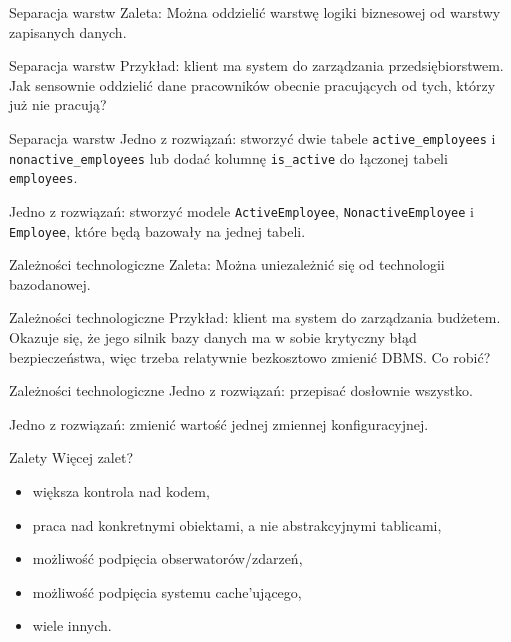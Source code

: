 \begin{frame}{Separacja warstw}
	Zaleta: Można oddzielić warstwę logiki biznesowej od warstwy zapisanych danych.
\end{frame}
	
\begin{frame}{Separacja warstw}	
	Przykład: klient ma system do zarządzania przedsiębiorstwem. Jak sensownie oddzielić dane pracowników obecnie pracujących od tych, którzy już nie pracują?
\end{frame}
	
\begin{frame}{Separacja warstw}
	Jedno z rozwiązań: stworzyć dwie tabele \texttt{active\_employees} i \texttt{nonactive\_employees} lub dodać kolumnę \texttt{is\_active} do łączonej tabeli \texttt{employees}.
	
	Jedno z rozwiązań: stworzyć modele \texttt{ActiveEmployee}, \texttt{NonactiveEmployee} i \texttt{Employee}, które będą bazowały na jednej tabeli.
\end{frame}

\begin{frame}{Zależności technologiczne}
	Zaleta: Można uniezależnić się od technologii bazodanowej.
\end{frame}
	
\begin{frame}{Zależności technologiczne}	
	Przykład: klient ma system do zarządzania budżetem. Okazuje się, że jego silnik bazy danych ma w sobie krytyczny błąd bezpieczeństwa, więc trzeba relatywnie bezkosztowo zmienić DBMS. Co robić?
\end{frame}
	
\begin{frame}{Zależności technologiczne}	
	Jedno z rozwiązań: przepisać dosłownie wszystko.
	
	Jedno z rozwiązań: zmienić wartość jednej zmiennej konfiguracyjnej.
\end{frame}

\begin{frame}{Zalety}	
	Więcej zalet?
	
	\begin{itemize}
		\item większa kontrola nad kodem,
		\item praca nad konkretnymi obiektami, a nie abstrakcyjnymi tablicami, 
		\item możliwość podpięcia obserwatorów/zdarzeń,
		\item możliwość podpięcia systemu cache'ującego,
		\item wiele innych. 
	\end{itemize}
\end{frame}


